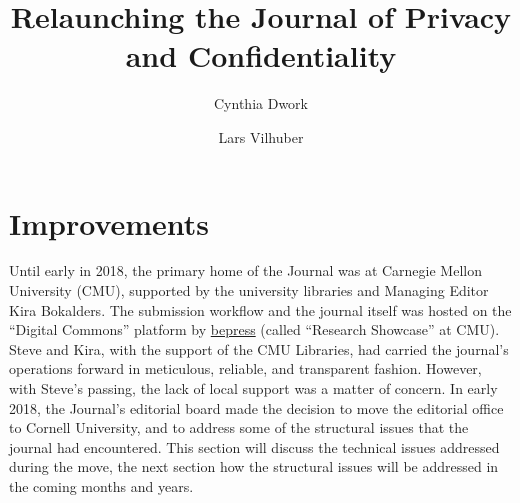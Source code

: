 \documentclass{jpcfinal} %
\begin{document}
\title[Relaunching JPC]{Relaunching the Journal of Privacy and Confidentiality}

\author{Cynthia Dwork}	%
\address{Harvard University}	%
\author{Lars Vilhuber}	%
\address{Cornell University}	%

\maketitle


\section{Improvements}

Until early in 2018, the primary home of the Journal was at Carnegie Mellon University (CMU), supported by the university libraries and Managing Editor Kira Bokalders. The submission workflow and the journal itself was hosted on the ``Digital Commons'' platform by \href{https://www.bepress.com}{bepress} (called ``Research Showcase'' at CMU). Steve and Kira, with the support of the CMU Libraries, had carried the journal's operations forward in meticulous, reliable, and transparent fashion. However, with Steve's passing, the lack of local support was a matter of concern. In early 2018, the Journal's editorial board made the decision to move the editorial office to Cornell University, and to address some of the structural issues that the journal had encountered. This section will discuss the technical issues addressed during the move, the next section how the structural issues will be addressed in the coming months and years.
\end{document}
